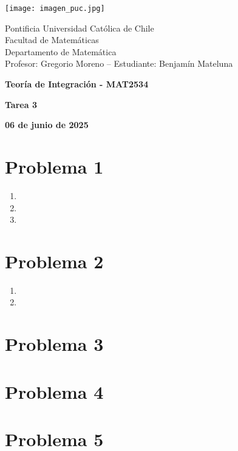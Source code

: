 \documentclass{article}
\begin{document}
\begin{minipage}{2.5cm}
    \texttt{[image: imagen\_puc.jpg]}
\end{minipage}
\begin{minipage}{14cm}
    {\sc Pontificia Universidad Católica de Chile\\
    Facultad de Matemáticas\\
    Departamento de Matemática\\
    Profesor: Gregorio Moreno -- Estudiante: Benjamín Mateluna}
\end{minipage}
\vspace{1ex}

{\centerline{\bf Teoría de Integración - MAT2534}
\centerline{\bf Tarea 3}}
\centerline{\bf 06 de junio de 2025}

\section*{Problema 1}
\begin{enumerate}
    \item 
    \item 
    \item 
\end{enumerate}

\section*{Problema 2}
\begin{enumerate}
    \item 
    \item 
\end{enumerate}

\section*{Problema 3}

\section*{Problema 4}

\section*{Problema 5}




\end{document}
